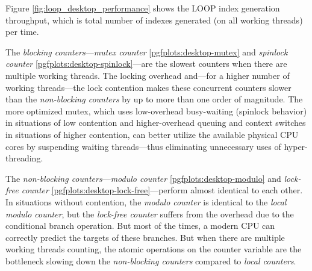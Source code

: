 \begin{@empty}
    Figure \ref{fig:loop_desktop_performance} shows the LOOP index generation throughput, which is total number of indexes generated (on all working threads) per time.


    The \emph{blocking counters}---\emph{mutex counter} \ref{pgfplots:desktop-mutex} and \emph{spinlock counter} \ref{pgfplots:desktop-spinlock}---are the slowest counters when there are multiple working threads. The locking overhead and---for a higher number of working threads---the lock contention makes these concurrent counters slower than the \emph{non-blocking counters} by up to more than one order of magnitude. The more optimized mutex, which uses low-overhead busy-waiting (spinlock behavior) in situations of low contention and higher-overhead queuing and context switches in situations of higher contention, can better utilize the available physical CPU cores by suspending waiting threads---thus eliminating unnecessary uses of hyper-threading.

    The \emph{non-blocking counters}---\emph{modulo counter} \ref{pgfplots:desktop-modulo} and \emph{lock-free counter} \ref{pgfplots:desktop-lock-free}---perform almost identical to each other. In situations without contention, the \emph{modulo counter} is identical to the \emph{local modulo counter}, but the \emph{lock-free counter} suffers from the overhead due to the conditional branch operation. But most of the times, a modern CPU can correctly predict the targets of these branches. But when there are multiple working threads counting, the atomic operations on the counter variable are the bottleneck slowing down the \emph{non-blocking counters} compared to \emph{local counters}.


\end{@empty}
